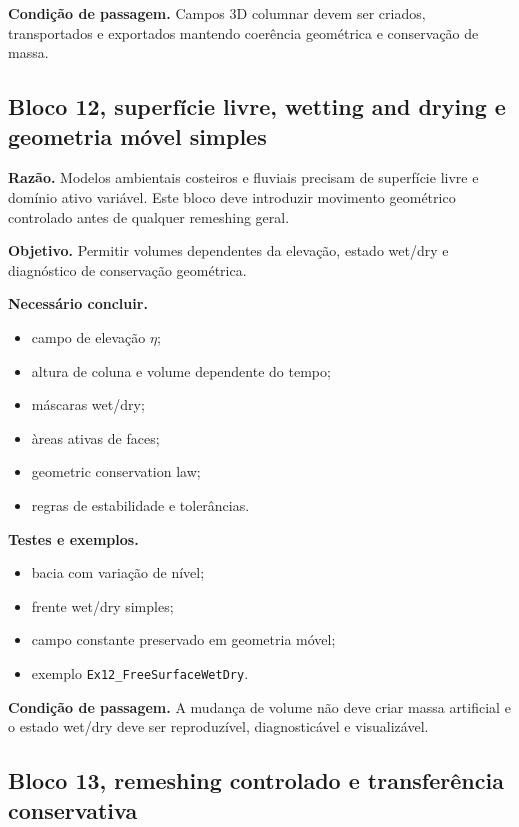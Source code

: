 \documentclass[11pt,a4paper]{article}
\begin{document}
\textbf{Condi\c{c}\~ao de passagem.} Campos 3D columnar devem ser criados, transportados e exportados mantendo coer\^encia geom\'etrica e conserva\c{c}\~ao de massa.

\subsection*{Bloco 12, superf\'icie livre, wetting and drying e geometria m\'ovel simples}

\textbf{Raz\~ao.} Modelos ambientais costeiros e fluviais precisam de superf\'icie livre e dom\'inio ativo vari\'avel. Este bloco deve introduzir movimento geom\'etrico controlado antes de qualquer remeshing geral.

\textbf{Objetivo.} Permitir volumes dependentes da eleva\c{c}\~ao, estado wet/dry e diagn\'ostico de conserva\c{c}\~ao geom\'etrica.

\textbf{Necess\'ario concluir.}
\begin{itemize}
  \item campo de eleva\c{c}\~ao \(\eta\);
  \item altura de coluna e volume dependente do tempo;
  \item m\'ascaras wet/dry;
  \item \`areas ativas de faces;
  \item geometric conservation law;
  \item regras de estabilidade e toler\^ancias.
\end{itemize}

\textbf{Testes e exemplos.}
\begin{itemize}
  \item bacia com varia\c{c}\~ao de n\'ivel;
  \item frente wet/dry simples;
  \item campo constante preservado em geometria m\'ovel;
  \item exemplo \texttt{Ex12\_FreeSurfaceWetDry}.
\end{itemize}

\textbf{Condi\c{c}\~ao de passagem.} A mudan\c{c}a de volume n\~ao deve criar massa artificial e o estado wet/dry deve ser reproduz\'ivel, diagnostic\'avel e visualiz\'avel.

\subsection*{Bloco 13, remeshing controlado e transfer\^encia conservativa}
\end{document}
